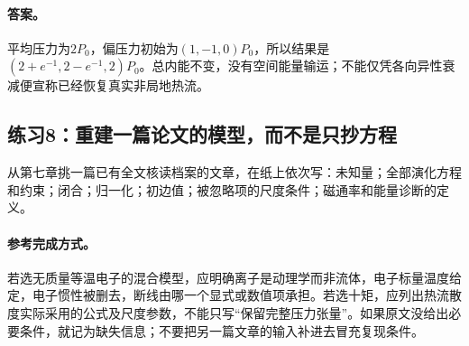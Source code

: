 \paragraph{答案。}
平均压力为$2P_0$，偏压力初始为$(1,-1,0)P_0$，所以结果是
$ (2+e^{-1},2-e^{-1},2)P_0$。总内能不变，没有空间能量输运；不能仅凭各向异性衰减便宣称已经恢复真实非局地热流。

\subsection{练习8：重建一篇论文的模型，而不是只抄方程}
从第七章挑一篇已有全文核读档案的文章，在纸上依次写：未知量；全部演化方程和约束；闭合；归一化；初边值；被忽略项的尺度条件；磁通率和能量诊断的定义。
\paragraph{参考完成方式。}
若选无质量等温电子的混合模型，应明确离子是动理学而非流体，电子标量温度给定，电子惯性被删去，断线由哪一个显式或数值项承担。若选十矩，应列出热流散度实际采用的公式及尺度参数，不能只写“保留完整压力张量”。如果原文没给出必要条件，就记为缺失信息；不要把另一篇文章的输入补进去冒充复现条件。
